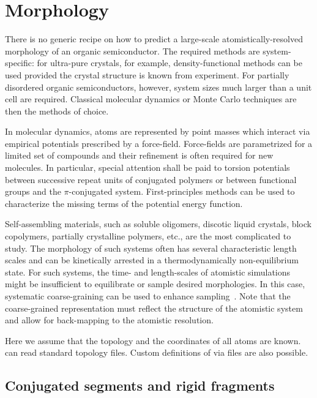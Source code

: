 \chapter{Morphology}
\label{sec:morphology}

There is no generic recipe on how to predict a large-scale atomistically-resolved morphology of an organic semiconductor. The required methods are system-specific: for ultra-pure crystals, for example, density-functional methods can be used provided the crystal structure is known from experiment. For partially disordered organic semiconductors, however, system sizes much larger than a unit cell  are required. Classical molecular dynamics or Monte Carlo techniques are then the methods of choice. 

In molecular dynamics, atoms are represented by point masses which interact via empirical potentials prescribed by a force-field. Force-fields are parametrized for a limited set of compounds and their refinement is often required for new molecules. In particular, special attention shall be paid to torsion potentials between successive repeat units of conjugated polymers or between functional groups and the $\pi$-conjugated system. First-principles methods can be used to characterize the missing terms of the potential energy function. 

Self-assembling materials, such as soluble oligomers, discotic liquid crystals, block copolymers, partially crystalline polymers, etc., are the most complicated to study. The morphology of such systems often has several characteristic length scales and can be kinetically arrested in a thermodynamically non-equilibrium state. For such systems, the time- and length-scales of atomistic simulations might be insufficient to equilibrate or sample desired morphologies. In this case, systematic coarse-graining can be used to enhance sampling~\cite{ruhle_versatile_2009}. Note that the coarse-grained representation must reflect the structure of the atomistic system and allow for back-mapping to the atomistic resolution.

Here we assume that the topology and the coordinates of all atoms are known. \votcactp can read standard \gromacs topology files. Custom definitions of  via \xml files are also possible.

\section{Conjugated segments and rigid fragments}
\label{sec:segments}

